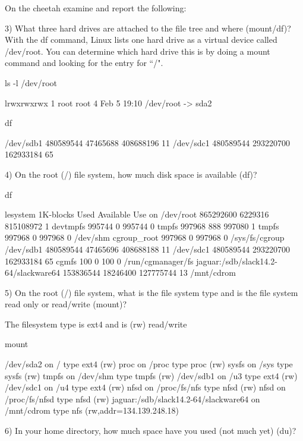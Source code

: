 On the {\ltt{}cheetah} examine and report the following:

3) What three hard drives are attached to the file tree and where (mount/df)?
With the df command, Linux lists one hard drive as a virtual device called 
{\ltt{}/dev/root}. You can determine which hard drive this is by doing a 
{\ltt{}mount} command and looking for the entry for ``/".

ls -l /dev/root


lrwxrwxrwx 1 root root 4 Feb  5 19:10 /dev/root -> sda2

df

/dev/sdb1                480589544  47465688 408688196  11%
/dev/sdc1                480589544 293220700 162933184  65%

4) On the root ({\ltt{}/}) file system, how much disk space is available (df)?

df

lesystem                           1K-blocks      Used Available Use%
on
/dev/root                            865292600   6229316 815108972   1%
devtmpfs                                995744         0    995744   0%
tmpfs                                   997968       888    997080   1%
tmpfs                                   997968         0    997968   0%
/dev/shm
cgroup_root                             997968         0    997968   0%
/sys/fs/cgroup
/dev/sdb1                            480589544  47465696 408688188  11%
/dev/sdc1                            480589544 293220700 162933184  65%
cgmfs                                      100         0       100   0%
/run/cgmanager/fs
jaguar:/sdb/slack14.2-64/slackware64 153836544  18246400 127775744  13%
/mnt/cdrom

5) On the root ({\ltt{}/}) file system, what is the file system type
and is the file system read only or read/write (mount)?

The filesystem type is ext4 and is (rw) read/write

mount

/dev/sda2 on / type ext4 (rw)
proc on /proc type proc (rw)
sysfs on /sys type sysfs (rw)
tmpfs on /dev/shm type tmpfs (rw)
/dev/sdb1 on /u3 type ext4 (rw)
/dev/sdc1 on /u4 type ext4 (rw)
nfsd on /proc/fs/nfs type nfsd (rw)
nfsd on /proc/fs/nfsd type nfsd (rw)
jaguar:/sdb/slack14.2-64/slackware64 on /mnt/cdrom type nfs
(rw,addr=134.139.248.18)

6) In your home directory, how much space have you used (not much yet) (du)?

